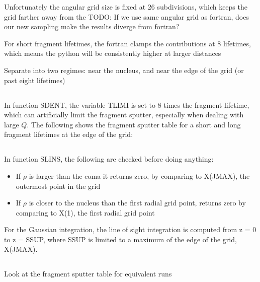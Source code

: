 \documentclass[11pt]{article}
\newcommand{\problempart}[1]{\subsection*{\contour{mybblack}{\textcolor{myblack}{#1}}}}
\begin{document}
Unfortunately the angular grid size is fixed at 26 subdivisions, which keeps the grid farther away from the
TODO: If we use same angular grid as fortran, does our new sampling make the results diverge from fortran?

For short fragment lifetimes, the fortran clamps the contributions at 8 lifetimes, which means the python will be consistently higher at larger distances

Separate into two regimes: near the nucleus, and near the edge of the grid (or past eight lifetimes)

\problempart{Fortran Fragment Sputter}
In function SDENT, the variable TLIMI is set to 8 times the fragment lifetime, which can artificially limit the fragment sputter, especially when dealing with large \(Q\).
The following shows the fragment sputter table for a short and long fragment lifetimes at the edge of the grid:

\problempart{Fortran Column Density}
In function SLINS, the following are checked before doing anything:
\begin{itemize}
  \item If \(\rho\) is larger than the coma it returns zero, by comparing to X(JMAX), the outermost point in the grid
  \item If \(\rho\) is closer to the nucleus than the first radial grid point, returns zero by comparing to X(1), the first radial grid point
\end{itemize}

For the Gaussian integration, the line of sight integration is computed from z = 0 to z = SSUP, where SSUP is limited to a maximum of the edge of the grid, X(JMAX).

\problempart{Python Fragment Sputter}
Look at the fragment sputter table for equivalent runs
\end{document}
